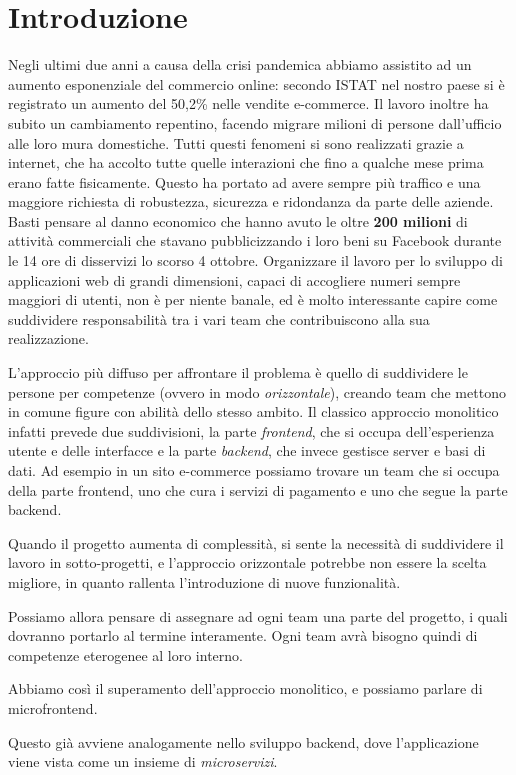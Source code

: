 \chapter{Introduzione}\label{ch:introduzione}
Negli ultimi due anni a causa della crisi pandemica abbiamo assistito ad un aumento esponenziale del commercio online:
secondo ISTAT nel nostro paese si è registrato un aumento del 50,2\% nelle vendite e-commerce.\cite{istat}
Il lavoro inoltre ha subito un cambiamento repentino, facendo migrare milioni di persone dall'ufficio alle loro mura domestiche.
Tutti questi fenomeni si sono realizzati grazie a internet, che ha accolto tutte quelle interazioni che fino a qualche mese prima
erano fatte fisicamente.
Questo ha portato ad avere sempre più traffico e una maggiore richiesta di robustezza, sicurezza e ridondanza da parte delle aziende.
Basti pensare al danno economico che hanno avuto le oltre \textbf{200 milioni} di attività commerciali che stavano pubblicizzando i loro beni su Facebook durante
le 14 ore di disservizi lo scorso 4 ottobre\cite{fbdown}.
Organizzare il lavoro per lo sviluppo di applicazioni web di grandi dimensioni, capaci di accogliere numeri sempre maggiori di utenti, non è per niente banale, ed è molto interessante
capire come suddividere responsabilità tra i vari team che contribuiscono alla sua realizzazione.

L'approccio più diffuso per affrontare il problema è quello di suddividere le persone per competenze (ovvero in modo \emph{orizzontale}), creando team che mettono in comune
figure con abilità dello stesso ambito. Il classico approccio monolitico infatti prevede due suddivisioni, la parte \emph{frontend}, che si occupa dell'esperienza 
utente e delle interfacce e la parte \emph{backend}, che invece gestisce server e basi di dati.
Ad esempio in un sito e-commerce possiamo trovare un team che si occupa della parte frontend, uno che cura 
i servizi di pagamento e uno che segue la parte backend. 

Quando il progetto aumenta di complessità, si sente la necessità 
di suddividere il lavoro in sotto-progetti, e l'approccio orizzontale potrebbe non essere la scelta migliore,
in quanto rallenta l'introduzione di nuove funzionalità.

Possiamo allora pensare di assegnare ad ogni team una parte del progetto, i quali dovranno portarlo al termine
interamente. Ogni team avrà bisogno quindi di competenze eterogenee al loro interno.

Abbiamo così il superamento dell'approccio monolitico, e possiamo parlare di microfrontend.

Questo già avviene analogamente nello sviluppo backend, dove l'applicazione viene vista come un
insieme di \emph{microservizi}.
